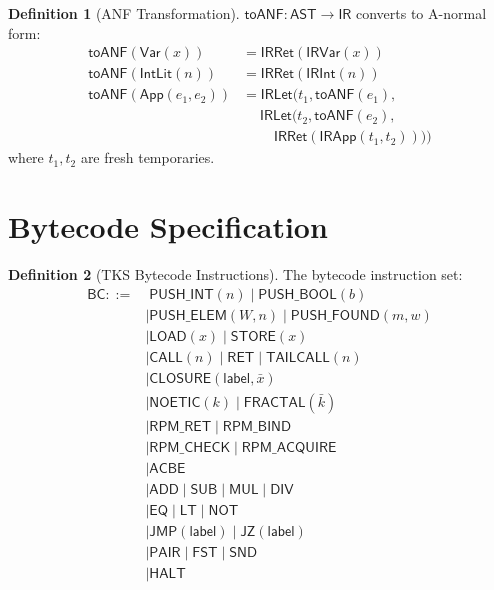 \documentclass[11pt,twoside,openright]{book}
\theoremstyle{definition}
\newtheorem{definition}{Definition}[chapter]
\theoremstyle{plain}
\theoremstyle{remark}
\newcommand{\AST}{\mathsf{AST}}              %
\newcommand{\IR}{\mathsf{IR}}                %
\newcommand{\BC}{\mathsf{BC}}                %
\begin{document}
\begin{definition}[ANF Transformation]
\label{def:anf-transform}
$\mathsf{toANF} : \AST \to \IR$ converts to A-normal form:
\begin{align}
\mathsf{toANF}(\mathsf{Var}(x)) &= \mathsf{IRRet}(\mathsf{IRVar}(x)) \\
\mathsf{toANF}(\mathsf{IntLit}(n)) &= \mathsf{IRRet}(\mathsf{IRInt}(n)) \\
\mathsf{toANF}(\mathsf{App}(e_1, e_2)) &= \mathsf{IRLet}(t_1, \mathsf{toANF}(e_1), \\
  &\quad\; \mathsf{IRLet}(t_2, \mathsf{toANF}(e_2), \\
  &\quad\quad\; \mathsf{IRRet}(\mathsf{IRApp}(t_1, t_2))))
\end{align}
where $t_1, t_2$ are fresh temporaries.
\end{definition}

\section{Bytecode Specification}

\begin{definition}[TKS Bytecode Instructions]
\label{def:bytecode}
The bytecode instruction set:
\begin{align}
\BC ::=&\; \mathsf{PUSH\_INT}(n) \mid \mathsf{PUSH\_BOOL}(b) \\
    &\mid \mathsf{PUSH\_ELEM}(W, n) \mid \mathsf{PUSH\_FOUND}(m, w) \\
    &\mid \mathsf{LOAD}(x) \mid \mathsf{STORE}(x) \\
    &\mid \mathsf{CALL}(n) \mid \mathsf{RET} \mid \mathsf{TAILCALL}(n) \\
    &\mid \mathsf{CLOSURE}(\mathsf{label}, \bar{x}) \\
    &\mid \mathsf{NOETIC}(k) \mid \mathsf{FRACTAL}(\bar{k}) \\
    &\mid \mathsf{RPM\_RET} \mid \mathsf{RPM\_BIND} \\
    &\mid \mathsf{RPM\_CHECK} \mid \mathsf{RPM\_ACQUIRE} \\
    &\mid \mathsf{ACBE} \\
    &\mid \mathsf{ADD} \mid \mathsf{SUB} \mid \mathsf{MUL} \mid \mathsf{DIV} \\
    &\mid \mathsf{EQ} \mid \mathsf{LT} \mid \mathsf{NOT} \\
    &\mid \mathsf{JMP}(\mathsf{label}) \mid \mathsf{JZ}(\mathsf{label}) \\
    &\mid \mathsf{PAIR} \mid \mathsf{FST} \mid \mathsf{SND} \\
    &\mid \mathsf{HALT}
\end{align}
\end{definition}
\end{document}
